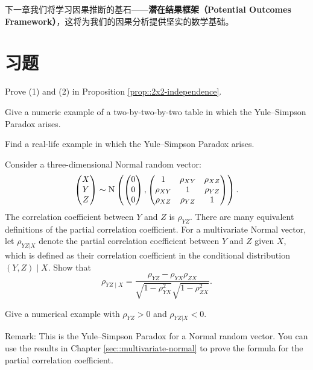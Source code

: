 下一章我们将学习因果推断的基石——\textbf{潜在结果框架（Potential Outcomes Framework）}，这将为我们的因果分析提供坚实的数学基础。

\section{习题}\label{sec:1-homework}

\begin{HomeworkProblem}\label{exr:1-1}

Prove (1) and (2) in Proposition \ref{prop::2x2-independence}.


\end{HomeworkProblem}

\begin{HomeworkProblem}\label{exr:1-2}


Give a numeric example of a two-by-two-by-two table in which the Yule--Simpson Paradox arises.

Find a real-life example in which the Yule--Simpson Paradox arises.



\end{HomeworkProblem}

\begin{HomeworkProblem}\label{exr:1-3}

Consider a three-dimensional Normal random vector:
\[
\begin{pmatrix}
X\\
Y\\
Z
\end{pmatrix}
\sim
\textsc{N}
\left(
\begin{pmatrix}
0\\
0\\
0
\end{pmatrix},
\begin{pmatrix}
1 & \rho_{XY} &\rho_{XZ} \\
  \rho_{XY}  & 1 & \rho_{YZ} \\
  \rho_{XZ} &  \rho_{YZ} & 1
\end{pmatrix}
\right) .
\]
The correlation coefficient between $Y$ and $Z$ is $\rho_{YZ}$.
There are many equivalent definitions of the partial correlation coefficient.
For a multivariate Normal vector, let $\rho_{YZ|X}$ denote the partial correlation coefficient between $Y$ and $Z$ given $X$, which is defined as their correlation coefficient in the conditional distribution $(Y, Z)\mid X$. Show that
\[
\rho_{YZ\mid X} = \frac{   \rho_{YZ} - \rho_{YX} \rho_{ZX}  }{  \sqrt{  1-\rho_{YX}^2 }  \sqrt{1- \rho_{ZX}^2  }  }  .
\]

Give a numerical example with $\rho_{YZ} > 0$ and $\rho_{YZ|X} < 0$.

Remark: This is the Yule--Simpson Paradox for a Normal random vector.
You can use the results in Chapter \ref{sec::multivariate-normal} to prove the formula for the partial correlation coefficient.



\end{HomeworkProblem}

